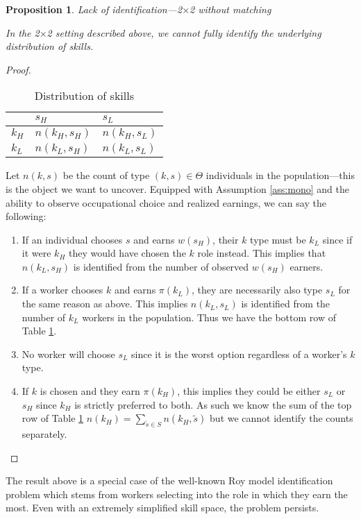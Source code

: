 \documentclass[12 pt]{article}
\newtheorem{proposition}{Proposition} %
\begin{document}
\begin{proposition}{Lack of identification---2$\times$2 without matching}
	
	In the 2$\times$2 setting described above, we cannot fully identify the underlying distribution of skills.
	\label{prop:identnomatch}
\end{proposition}
\begin{proof}
\begin{table}[H]
	\centering
	\begin{tabular}{l|ll}
		& $s_H$        & $s_L$        \\ \hline
		$k_H$ & $n(k_H,s_H)$ & $n(k_H,s_L)$ \\
		$k_L$ & $n(k_L,s_H)$ & $n(k_L,s_L)$
		
	\end{tabular}
	\caption{Distribution of skills}
	\label{tab:2by2counts}
\end{table}
Let $n(k,s)$ be the count of type $(k,s)\in \Theta$ individuals in the population---this is the object we want to uncover. Equipped with Assumption \ref{ass:mono} and the ability to observe occupational choice and realized earnings, we can say the following:
\begin{enumerate}
	\item If an individual chooses $s$ and earns $w(s_H)$, their $k$ type must be $k_L$ since if it were $k_H$ they would have chosen the $k$ role instead. This implies that $n(k_L,s_H)$ is identified from the number of observed $w(s_H)$ earners.
	\item If a worker chooses $k$ and earns $\pi(k_L)$, they are necessarily also type $s_L$ for the same reason as above. This implies $n(k_L,s_L)$ is identified from the number of $k_L$ workers in the population. Thus we have the bottom row of Table \ref{tab:2by2counts}.
	\item No worker will choose $s_L$ since it is the worst option regardless of a worker's $k$ type.
	\item If $k$ is chosen and they earn $\pi(k_H)$, this implies they could be either $s_L$ or $s_H$ since $k_H$ is strictly preferred to both. As such we know the sum of the top row of Table \ref{tab:2by2counts} $n(k_H)=\sum_{\tilde{s}\in S}n(k_H,\tilde{s})$ but we cannot identify the counts separately.
\end{enumerate}
\end{proof}
The result above is a special case of the well-known Roy model identification problem which stems from workers selecting into the role in which they earn the most. Even with an extremely simplified skill space, the problem persists. 
\end{document}
